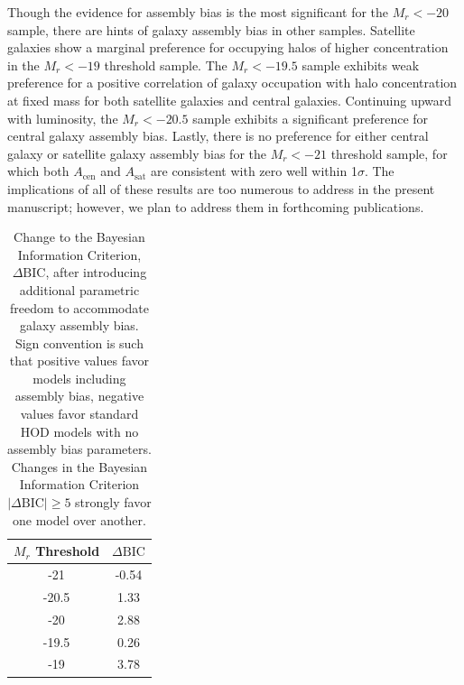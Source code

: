 \documentclass[usenatbib,usegraphicx,letterpaper]{mn2e}
\begin{document}
Though the evidence for assembly bias is the most significant for the $M_r<-20$ sample,
there are hints of galaxy assembly bias in other samples. Satellite galaxies show a marginal preference
for occupying halos of higher concentration in the $M_r < -19$ threshold sample. The $M_r < -19.5$
sample exhibits weak preference for a positive correlation of galaxy occupation with halo concentration at fixed
mass for both satellite galaxies and central galaxies. Continuing upward with luminosity,
the $M_r < -20.5$ sample exhibits a significant preference for central galaxy assembly bias.
Lastly, there is no preference for either central galaxy or satellite galaxy assembly bias
for the $M_r < -21$ threshold sample, for which both $A_{\mathrm{cen}}$ and $A_{\mathrm{sat}}$
are consistent with zero well within 1$\sigma$. The implications of all of these results are too numerous 
to address in the present manuscript; however, we plan to address them in forthcoming publications.

\begin{table}
\begin{center}
{\renewcommand{\arraystretch}{1.3}
\renewcommand{\tabcolsep}{0.2cm}
\begin{tabular}{c c}
\hline
\hline
$M_r$ Threshold & $\Delta \mathrm{BIC}$ \\
\hline
-21 & -0.54 \\
-20.5 & 1.33 \\
-20 & 2.88\\
-19.5 & 0.26\\
-19 & 3.78\\
\hline
\end{tabular}
\medskip
\caption{
Change to the Bayesian Information Criterion, $\Delta \mathrm{BIC}$,
after introducing additional parametric freedom to accommodate galaxy
assembly bias. Sign convention is such that positive values favor models including
assembly bias, negative values favor standard HOD models with no assembly bias parameters. Changes in
the Bayesian Information Criterion $\vert \Delta \mathrm{BIC}\vert \ge 5$ strongly favor one model
over another.
}
 }
 \label{table:bic}
 \end{center}
\end{table}
\end{document}
